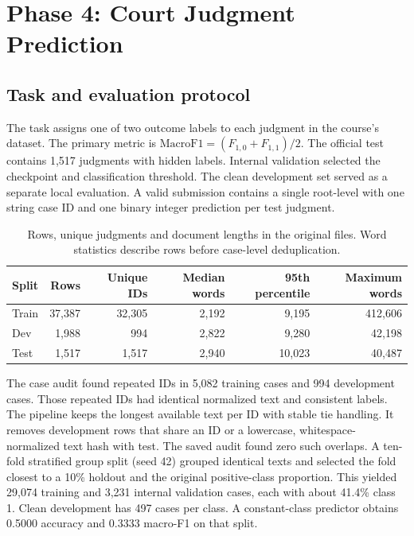 \section{Phase 4: Court Judgment Prediction}
\label{sec:phase4}

\subsection{Task and evaluation protocol}

The task assigns one of two outcome labels to each judgment in the course's
 dataset. The primary metric is
$\mathrm{MacroF1}=(F_{1,0}+F_{1,1})/2$. The official test contains 1,517
judgments with hidden labels. Internal validation selected the checkpoint and
classification threshold. The clean development set served as a separate local
evaluation. A valid submission contains a single root-level
 with one string case ID and one binary integer prediction
per test judgment.

\begin{table}[htbp]
\centering\small
\caption{Rows, unique judgments and document lengths in the original files.
Word statistics describe rows before case-level deduplication.}
\label{tab:p4-data}
\begin{tabular}{lrrrrr}
\toprule
Split & Rows & Unique IDs & Median words & 95th percentile & Maximum words \\
\midrule
Train & 37,387 & 32,305 & 2,192 & 9,195 & 412,606 \\
Dev   & 1,988  & 994    & 2,822 & 9,280 & 42,198 \\
Test  & 1,517  & 1,517  & 2,940 & 10,023 & 40,487 \\
\bottomrule
\end{tabular}
\end{table}

The case audit found repeated IDs in 5,082 training cases and 994 development
cases. Those repeated IDs had identical normalized text and consistent labels.
The pipeline keeps the longest available text per ID with stable tie handling.
It removes development rows that share an ID or a lowercase, whitespace-normalized
text hash with test. The saved audit found zero such overlaps. A ten-fold
stratified group split (seed 42) grouped identical texts and selected the fold
closest to a 10\% holdout and the original positive-class proportion. This
yielded 29,074 training and 3,231 internal validation cases, each with about
41.4\% class 1. Clean development has 497 cases per class. A constant-class
predictor obtains 0.5000 accuracy and 0.3333 macro-F1 on that split.

